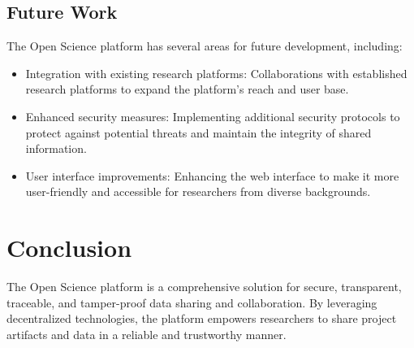 \documentclass{article}
\begin{document}
\subsection{Future Work}

The Open Science platform has several areas for future development, including:

\begin{itemize}
      \item Integration with existing research platforms: Collaborations with established research platforms to expand the platform's reach and user base.
      \item Enhanced security measures: Implementing additional security protocols to protect against potential threats and maintain the integrity of shared information.
      \item User interface improvements: Enhancing the web interface to make it more user-friendly and accessible for researchers from diverse backgrounds.
\end{itemize}

\section{Conclusion}
The Open Science platform is a comprehensive solution for secure, transparent, traceable, and tamper-proof data sharing and collaboration. By leveraging decentralized technologies, the platform empowers researchers to share project artifacts and data in a reliable and trustworthy manner.
\end{document}
